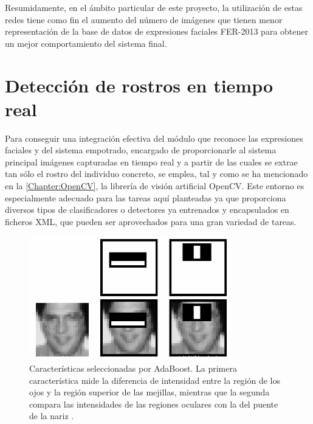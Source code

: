 Resumidamente, en el ámbito particular de este proyecto, la utilización de estas redes tiene como fin el aumento del número de imágenes que tienen menor representación de la base de datos de expresiones faciales FER-2013 para obtener un mejor comportamiento del sistema final.

\section{Detección de rostros en tiempo real} \label{Chapter:FaceDetection}

Para conseguir una integración efectiva del módulo que reconoce las expresiones faciales y del sistema empotrado, encargado de proporcionarle al sistema principal imágenes capturadas en tiempo real y a partir de las cuales se extrae tan sólo el rostro del individuo concreto, se emplea, tal y como se ha mencionado en la \autoref{Chapter:OpenCV}, la librería de visión artificial OpenCV. Este entorno es especialmente adecuado para las tareas aquí planteadas ya que proporciona diversos tipos de clasificadores o detectores ya entrenados y encapsulados en ficheros XML, que pueden ser aprovechados para una gran variedad de tareas.

\begin{figure}
    \centering
    \includegraphics[scale=0.8]{Images/Haar.png}
    \caption{Características seleccionadas por AdaBoost. La primera característica mide la diferencia de intensidad entre la región de los ojos y la región superior de las mejillas, mientras que la segunda compara las intensidades de las regiones oculares con la del puente de la nariz \cite{Viola}.}
    \label{fig:Haar}
\end{figure}

